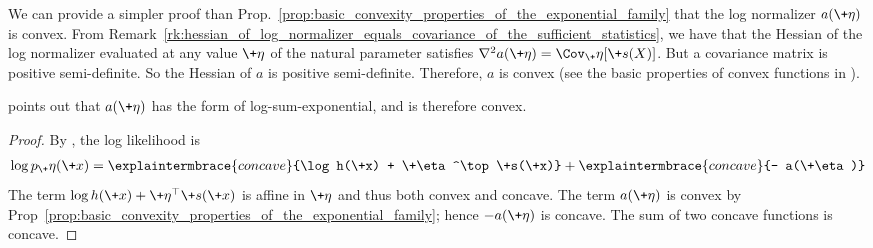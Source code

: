 \documentclass{article} %
\newcommand{\obs}{\+x}
\newcommand{\logNormalizerFunction}{a}
\newcommand{\sufficientStatsFunction}{\+s}
\newcommand{\carrierDensity}{h}
\newcommand{\naturalParam}{\+\eta}
\begin{document}
\begin{remark}
We can provide a simpler proof than Prop.~\ref{prop:basic_convexity_properties_of_the_exponential_family} that the log normalizer $\logNormalizerFunction(\naturalParam)$ is convex.  From Remark~\ref{rk:hessian_of_log_normalizer_equals_covariance_of_the_sufficient_statistics}, we have that the Hessian of the log normalizer evaluated at any value $\naturalParam$ of the natural parameter  satisfies $\nabla^2 \logNormalizerFunction(\naturalParam) = \Cov_\naturalParam[\sufficientStatsFunction(X)]$. But a covariance matrix is positive semi-definite.  So the Hessian of $\logNormalizerFunction$ is positive semi-definite.  Therefore, $\logNormalizerFunction$  is convex (see the basic properties of convex functions in  \citet{grasmair2016basic}).
	
\end{remark}

\begin{remark}
\citet{blei2011exponential} points out that $\logNormalizerFunction(\naturalParam)$ has the form of log-sum-exponential, and is therefore convex.
\end{remark}

\begin{proposition}
\label{prop:log_likelihod_of_exponential_family_is_concave}
\end{proposition}

\begin{proof}
By , the log likelihood is 
%
\begin{align*}
\log p_\naturalParam(\obs) =  \explaintermbrace{concave}{\log \carrierDensity(\obs) + \naturalParam^\top \sufficientStatsFunction(\obs)} + \explaintermbrace{concave}{- \logNormalizerFunction(\naturalParam)}	 
\end{align*}
%  
The term $ \log \carrierDensity(\obs)+ \naturalParam^\top \sufficientStatsFunction(\obs) $ is affine in $\naturalParam$ and thus both convex and concave. The term $\logNormalizerFunction(\naturalParam)$ is convex by Prop~\ref{prop:basic_convexity_properties_of_the_exponential_family}; hence $-\logNormalizerFunction(\naturalParam)$ is concave. The sum of two concave functions is concave.	
\end{proof}
 
\end{document}
